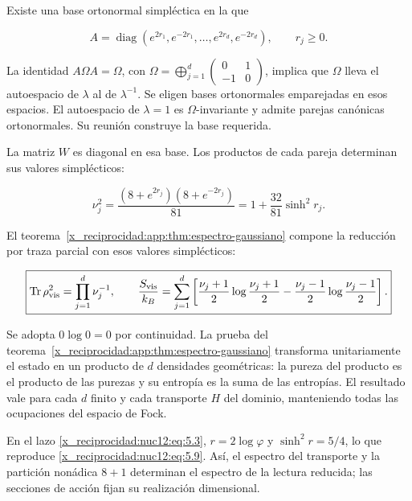 Existe una base ortonormal simpléctica en la que


\[
A=\operatorname{diag}(e^{2r_1},e^{-2r_1},\ldots,
e^{2r_d},e^{-2r_d}),\qquad r_j\ge0.
\]



La identidad \(A\Omega A=\Omega\), con \(\Omega=\bigoplus_{j=1}^d\left(\begin{smallmatrix}0&1\\-1&0\end{smallmatrix}\right)\), implica que \(\Omega\) lleva el autoespacio de \(\lambda\) al de \(\lambda^{-1}\). Se eligen bases ortonormales emparejadas en esos espacios. El autoespacio de \(\lambda=1\) es \(\Omega\)-invariante y admite parejas canónicas ortonormales. Su reunión construye la base requerida.

La matriz \(W\) es diagonal en esa base. Los productos de cada pareja determinan sus valores simplécticos:



\begin{equation}
\boxed{\nu_j^2=
\frac{(8+e^{2r_j})(8+e^{-2r_j})}{81}
=1+\frac{32}{81}\sinh^2r_j.}
\label{x_reciprocidad:nuc12:eq:6.1}
\end{equation}



El teorema~\ref{x_reciprocidad:app:thm:espectro-gaussiano} compone la reducción por traza parcial con esos valores simplécticos:



\begin{equation}
\boxed{\operatorname{Tr}\rho_{\rm vis}^2=\prod_{j=1}^d\nu_j^{-1},
\qquad
\frac{S_{\rm vis}}{k_B}=\sum_{j=1}^d
\left[\frac{\nu_j+1}{2}\log\frac{\nu_j+1}{2}
-\frac{\nu_j-1}{2}\log\frac{\nu_j-1}{2}\right].}
\label{x_reciprocidad:nuc12:eq:6.2}
\end{equation}



Se adopta \(0\log0=0\) por continuidad. La prueba del teorema~\ref{x_reciprocidad:app:thm:espectro-gaussiano} transforma unitariamente el estado en un producto de \(d\) densidades geométricas: la pureza del producto es el producto de las purezas y su entropía es la suma de las entropías. El resultado vale para cada \(d\) finito y cada transporte \(H\) del dominio, manteniendo todas las ocupaciones del espacio de Fock.

En el lazo \eqref{x_reciprocidad:nuc12:eq:5.3}, \(r=2\log\varphi\) y \(\sinh^2r=5/4\), lo que reproduce \eqref{x_reciprocidad:nuc12:eq:5.9}. Así, el espectro del transporte y la partición nonádica \(8+1\) determinan el espectro de la lectura reducida; las secciones de acción fijan su realización dimensional.

